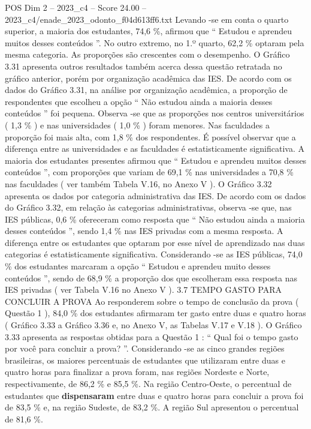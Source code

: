 \begin{textsample}{POS Dim 2 – 2023\_c4 – Score 24.00 – 2023\_c4/enade\_2023\_odonto\_f04d613ff6.txt}
Levando -se em conta o quarto superior, a maioria dos estudantes, 74,6 \%, afirmou que “ Estudou e aprendeu muitos desses conteúdos ”.
No outro extremo, no 1.º quarto, 62,2 \% optaram pela mesma categoria.
As proporções são crescentes com o desempenho.
O Gráfico 3.31 apresenta outros resultados também acerca dessa questão retratada no gráfico anterior, porém por organização acadêmica das IES.
De acordo com os dados do Gráfico 3.31, na análise por organização acadêmica, a proporção de respondentes que escolheu a opção “ Não estudou ainda a maioria desses conteúdos ” foi pequena.
Observa -se que as proporções nos centros universitários ( 1,3 \% ) e nas universidades ( 1,0 \% ) foram menores.
Nas faculdades a proporção foi mais alta, com 1,8 \% dos respondentes.
É possível observar que a diferença entre as universidades e as faculdades é estatisticamente significativa.
A maioria dos estudantes presentes afirmou que “ Estudou e aprendeu muitos desses conteúdos ”, com proporções que variam de 69,1 \% nas universidades a 70,8 \% nas faculdades ( ver também Tabela V.16, no Anexo V ).
O Gráfico 3.32 apresenta os dados por categoria administrativa das IES.
De acordo com os dados do Gráfico 3.32, em relação às categorias administrativas, observa -se que, nas IES públicas, 0,6 \% ofereceram como resposta que “ Não estudou ainda a maioria desses conteúdos ”, sendo 1,4 \% nas IES privadas com a mesma resposta.
A diferença entre os estudantes que optaram por esse nível de aprendizado nas duas categorias é estatisticamente significativa.
Considerando -se as IES públicas, 74,0 \% dos estudantes marcaram a opção “ Estudou e aprendeu muito desses conteúdos ”, sendo de 68,9 \% a proporção dos que escolheram essa resposta nas IES privadas ( ver Tabela V.16 no Anexo V ). 3.7 TEMPO GASTO PARA CONCLUIR A PROVA Ao responderem sobre o tempo de conclusão da prova ( Questão 1 ), 84,0 \% dos estudantes afirmaram ter gasto entre duas e quatro horas ( Gráfico 3.33 a Gráfico 3.36 e, no Anexo V, as Tabelas V.17 e V.18 ).
O Gráfico 3.33 apresenta as respostas obtidas para a Questão 1 : “ Qual foi o tempo gasto por você para concluir a prova? ”.
Considerando -se as cinco grandes regiões brasileiras, os maiores percentuais de estudantes que utilizaram entre duas e quatro horas para finalizar a prova foram, nas regiões Nordeste e Norte, respectivamente, de 86,2 \% e 85,5 \%.
Na região Centro-Oeste, o percentual de estudantes que \textbf{dispensaram} entre duas e quatro horas para concluir a prova foi de 83,5 \% e, na região Sudeste, de 83,2 \%.
A região Sul apresentou o percentual de 81,6 \%.

\end{textsample}

